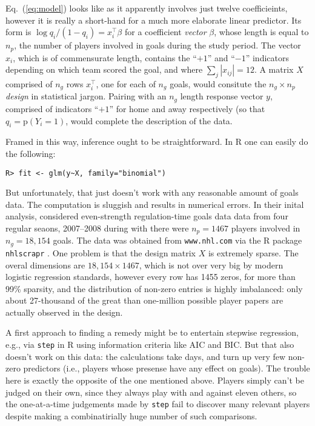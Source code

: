 Eq.~(\ref{eq:model}) looks like as it apparently involves just twelve
coefficieints, however it is really a short-hand for a much more elaborate
linear predictor. Its form is $\log q_i/(1-q_i) = x_i^\top \beta$ for a
coefficient {\em vector} $\beta$, whose length is equal to $n_p$, the number
of players involved in goals during the study period.  The vector $x_i$, which
is of commensurate length, contains the ``$+1$'' and ``$-1$'' indicators
depending on which team scored the goal, and where $\sum_j |x_{ij}| = 12$.  A
matrix $X$ comprised of $n_g$ rows $x_i^\top$, one for each of $n_g$ goals,
would consitute the $n_g \times n_p$ {\em design} in statistical jargon.
Pairing with an $n_g$ length response vector $y$, comprised of indicators
``$+1$'' for home and away respectively (so that $q_i = \mathrm{p}(Y_i = 1)$,
would complete the description of the data.

Framed in this way, inference ought to be straightforward.  In {\sf R}
one can easily do the following:
\begin{verbatim}
R> fit <- glm(y~X, family="binomial")
\end{verbatim}
But unfortunately, that just doesn't work with any reasonable amount of goals
data.  The computation is sluggish and results in numerical errors. In their
inital analysis, \cite{gramacy:jensen:taddy:2013} considered even-strength
regulation-time goals data data from four regular seaons, 2007--2008 during
with there were $n_p = 1467$ players involved in $n_g = 18,154$ goals.  The
data was obtained from \verb!www.nhl.com! via the {\sf R} package {\tt
nhlscrapr} \cite{nhlscrapr}. One problem is that the design matrix $X$ is
extremely sparse. The overal dimensions are $18,154 \times 1467$, which is
not over very big by modern logistic regression standards, however every row
has 1455 zeros, for more than 99\% sparsity, and the distribution of non-zero
entries is highly imbalanced: only about 27-thousand of the great than
one-million possible player papers are actually observed in the design.  

A first approach to finding a remedy might be to entertain stepwise
regression, e.g., via {\tt step} in {\sf R} using information criteria
like AIC and BIC.  But that also doesn't work on this data: the calculations
take days, and turn up very few non-zero predictors (i.e., players whose
presense have any effect on goals).  The trouble here is exactly the opposite
of the one mentioned above.  Players simply can't be judged on their own, since
they always play with and against eleven others, so the one-at-a-time judgements
made by {\tt step} fail to discover many relevant players despite making
a combinatirially huge number of such comparisons.


